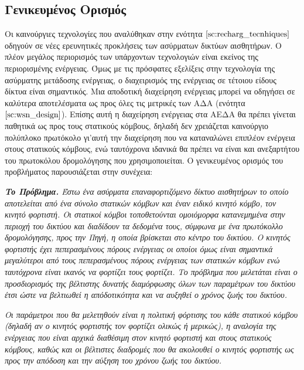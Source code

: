 \subsection{Γενικευμένος Ορισμός}
Οι καινούργιες τεχνολογίες που αναλύθηκαν στην ενότητα $\ref{sc:recharg_tecnhiques}$ οδηγούν σε νέες ερευνητικές προκλήσεις των ασύρματων δικτύων αισθητήρων. Ο πλέον
μεγάλος περιορισμός των υπάρχοντων τεχνολογιών είναι εκείνος της περιορισμένης ενέργειας. Όμως με τις πρόσφατες εξελίξεις στην τεχνολογία της ασύρματης μετάδοσης
ενέργειας, ο διαχειρισμός της ενέργειας σε τέτοιου είδους δίκτυα είναι σημαντικός. Μια αποδοτική διαχείρηση ενέργειας μπορεί να οδηγήσει σε καλύτερα αποτελέσματα ως
προς όλες τις μετρικές των ΑΔΑ (ενότητα $\ref{sc:wsn_design}$). Επίσης αυτή η διαχείρηση ενέργειας στα ΑΕΔΑ θα πρέπει γίνεται παθητικά ως προς τους στατικούς κόμβους,
δηλαδή δεν χρειάζεται καινούργιο πολύπλοκο πρωτόκολο γι'αυτή την διαχείρηση που να καταναλώνει επιπλέον ενέργεια στους στατικούς κόμβους, ενώ ταυτόχρονα ιδανικά θα
πρέπει να είναι και ανεξαρτήτου του πρωτοκόλου δρομολόγησης που χρησιμοποιείται. Ο γενικευμένος ορισμός του προβλήματος παρουσιάζεται στην συνέχεια:

\textit{\textbf{Το Πρόβλημα.} Έστω ένα ασύρματα επαναφορτιζόμενο δίκτυο αισθητήρων το οποίο αποτελείται από ένα σύνολο στατικών κόμβων και έναν ειδικό κινητό κόμβο,
τον κινητό φορτιστή. Οι στατικοί κόμβοι τοποθετούνται ομοιόμορφα κατανεμημένα στην περιοχή του δικτύου και διαδίδουν τα δεδομένα τους, σύμφωνα με ένα πρωτόκολλο
δρομολόγησης, προς την Πηγή, η οποία βρίσκεται στο κέντρο του δικτύου. Ο κινητός φορτιστής έχει πεπερασμένους πόρους ενέργειας οι οποίοι όμως είναι σημαντικά
μεγαλύτεροι από τους πεπερασμένους πόρους ενέργειας των στατικών κόμβων ενώ ταυτόχρονα είναι ικανός να φορτίζει τους φορτίζει. Το πρόβλημα που μελετάται είναι ο
προσδιορισμός της βέλτιστης δυνατής διαμόρφωσης όλων των παραμέτρων του δικτύου έτσι ώστε να
βελτιωθεί η απόδοτικότητα και να αυξηθεί ο χρόνος ζωής του δικτύου.}

\textit{Οι παράμετροι που θα μελετηθούν είναι η πολιτική φόρτισης του κάθε στατικού κόμβου (δηλαδή αν ο κινητός φορτιστής τον φορτίζει ολικώς ή μερικώς), η αναλογία
της ενέργειας που είναι αρχικά διαθέσιμη στον κινητό φορτιστή και στους στατικούς κόμβους, καθώς και οι βέλτιστες διαδρομές που θα ακολουθεί ο κινητός φορτιστής ως
προς την απόδοση και την αύξηση του χρόνου ζωής του δικτύου.}



